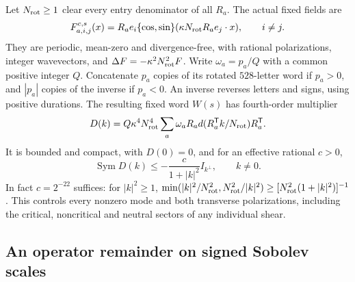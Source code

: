 \documentclass[11pt,a4paper]{amsart}
\theoremstyle{definition}
\theoremstyle{remark}
\numberwithin{equation}{section}
\begin{document}
Let $N_{\rm rot}\ge1$ clear every entry denominator of all $R_a$. The actual fixed fields
are
\begin{equation}
 F_{a,i,j}^{c,s}(x)=R_ae_i\{\cos,\sin\}
             (\kappa N_{\rm rot} R_ae_j\cdot x),\qquad i\ne j.
 \label{fnd:actual-fields}
\end{equation}
They are periodic, mean-zero and divergence-free, with rational polarizations,
integer wavevectors, and $\Delta F=-\kappa^2N_{\rm rot}^2F$. Write
$\omega_a=p_a/Q$ with a common positive integer $Q$. Concatenate $p_a$ copies
of its rotated $528$-letter word if $p_a>0$, and $|p_a|$ copies of the inverse
if $p_a<0$. An inverse reverses letters and signs, using positive durations.
The resulting fixed word $W(s)$ has fourth-order multiplier
\begin{equation}
 D(k)=Q\kappa^4N_{\rm rot}^4\sum_a\omega_aR_a
             d(R_a^{\mathsf T}k/N_{\rm rot})R_a^{\mathsf T}.
 \label{fnd:final-D}
\end{equation}
It is bounded and compact, with $D(0)=0$, and for an effective rational $c>0$,
\begin{equation}
 \operatorname{Sym}D(k)\le-\frac{c}{1+|k|^2}I_{k^\perp},\qquad k\ne0.
 \label{fnd:D-gap}
\end{equation}
In fact $c=2^{-22}$ suffices: for $|k|^2\ge1$,
$\min(|k|^2/N_{\rm rot}^2,N_{\rm rot}^2/|k|^2)\ge[N_{\rm rot}^2(1+|k|^2)]^{-1}$.
This controls every nonzero mode and both transverse polarizations, including
the critical, noncritical and neutral sectors of any individual shear.

\subsection{An operator remainder on signed Sobolev scales}
\end{document}
